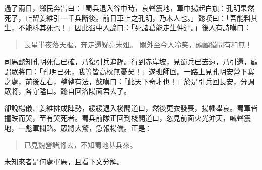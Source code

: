 過了兩日，鄉民奔告曰：「蜀兵退入谷中時，哀聲震地，軍中揚起白旗：孔明果然死了，止留姜維引一千兵斷後。前日車上之孔明，乃木人也。」懿嘆曰：「吾能料其生，不能料其死也！」因此蜀中人諺曰：「死諸葛能走生仲達。」後人有詩嘆曰：

\begin{quote}
長星半夜落天樞，奔走還疑亮未殂。
關外至今人冷笑，頭顱猶問有和無！
\end{quote}

司馬懿知孔明死信已確，乃復引兵追趕。行到赤岸坡，見蜀兵已去遠，乃引還，顧謂眾將曰：「孔明已死，我等皆高枕無憂矣！」遂班師回。一路上見孔明安營下寨之處，前後左右，整整有法，懿嘆曰：「此天下奇才也！」於是引兵回長安，分調眾將，各守隘口。懿自回洛陽面君去了。

卻說楊儀、姜維排成陣勢，緩緩退入棧閣道口，然後更衣發喪，揚幡舉哀。蜀軍皆撞跌而哭，至有哭死者。蜀兵前隊正回到棧閣道口，忽見前面火光沖天，喊聲震地，一彪軍攔路。眾將大驚，急報楊儀。正是：

\begin{quote}
已見魏營諸將去，不知蜀地甚兵來。
\end{quote}

未知來者是何處軍馬，且看下文分解。
